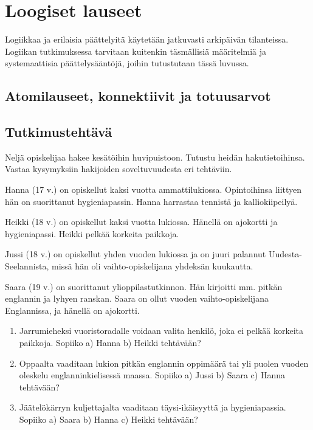 \newpage


\chapter{Loogiset lauseet}

Logiikkaa ja erilaisia päättelyitä käytetään jatkuvasti arkipäivän tilanteissa. Logiikan tutkimuksessa tarvitaan kuitenkin täsmällisiä mää\-ri\-tel\-miä ja systemaattisia päättelysääntöjä, joihin tutustutaan tässä luvussa.

\section{Atomilauseet, konnektiivit ja totuusarvot}
\label{konnektiivit}

\section*{Tutkimustehtävä}
Neljä opiskelijaa hakee kesätöihin huvipuistoon. Tutustu heidän hakutietoihinsa. Vastaa kysymyksiin hakijoiden soveltuvuudesta eri tehtäviin.

Hanna (17 v.) on opiskellut kaksi vuotta ammattilukiossa. Opintoihinsa liittyen hän on suorittanut hygieniapassin. Hanna harrastaa tennistä ja kalliokiipeilyä.

Heikki (18 v.) on opiskellut kaksi vuotta lukiossa. Hänellä on ajokortti ja hygieniapassi. Heikki pelkää korkeita paikkoja.

Jussi (18 v.) on opiskellut yhden vuoden lukiossa ja on juuri palannut Uudesta-Seelannista, missä hän oli vaihto-opiskelijana yhdeksän kuukautta.

Saara (19 v.) on suorittanut ylioppilastutkinnon. Hän kirjoitti mm. pitkän englannin ja lyhyen ranskan. Saara on ollut vuoden vaihto-opiskelijana Englannissa, ja hänellä on ajokortti.

\begin{enumerate}
\item Jarrumieheksi vuoristoradalle voidaan valita henkilö, joka ei pelkää korkeita paikkoja. Sopiiko a) Hanna b) Heikki teh\-tä\-vään?
\item Oppaalta vaaditaan lukion pitkän englannin oppimäärä tai yli puolen vuoden oleskelu englanninkielisessä maassa. Sopiiko a) Jussi b) Saara c) Hanna tehtävään?
\item Jäätelökärryn kuljettajalta vaaditaan täysi-ikäisyyttä ja hygieniapassia. Sopiiko a) Saara b) Hanna c) Heikki tehtävään?
\end{enumerate}

